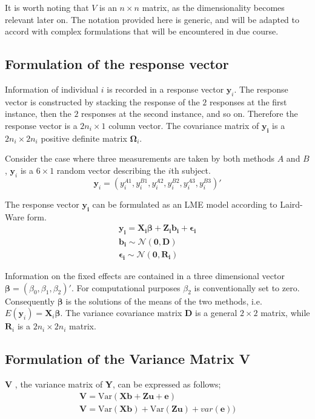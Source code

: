 \documentclass[12pt, a4paper]{report}
\theoremstyle{plain}
\theoremstyle{definition}
\theoremstyle{remark}
\begin{document}
It is worth noting that $V$ is an $n \times n$ matrix, as the dimensionality becomes relevant later on. The notation provided here is generic, and will be adapted to accord with complex formulations that will be encountered in due course.

\newpage

\subsection{Formulation of the response vector}
Information of individual $i$ is recorded in a response vector $\boldsymbol{y}_{i}$. The response vector is constructed by stacking the response of the $2$ responses at the first instance, then the $2$ responses at the second instance, and so on. Therefore the response vector is a $2n_{i} \times 1$ column vector.
The covariance matrix of $\boldsymbol{y_{i}}$ is a $2n_{i} \times 2n_{i}$ positive definite matrix $\boldsymbol{\Omega}_{i}$.

Consider the case where three measurements are taken by both methods $A$ and $B$, $\boldsymbol{y}_{i}$ is a $6 \times 1$ random vector describing the $i$th subject.
\[
\boldsymbol{y}_{i} = (y_{i}^{A1},y_{i}^{B1},y_{i}^{A2},y_{i}^{B2},y_{i}^{A3},y_{i}^{B3}) \prime
\]

The response vector $\boldsymbol{y_{i}}$ can be formulated as an LME model according to Laird-Ware form.
\begin{eqnarray*}
	\boldsymbol{y_{i}} = \boldsymbol{X_{i}\beta}  + \boldsymbol{Z_{i}b_{i}} + \boldsymbol{\epsilon_{i}}\\
	\boldsymbol{b_{i}} \sim \mathcal{N}(\boldsymbol{0,D})\\
	\boldsymbol{\epsilon_{i}} \sim \mathcal{N}(\boldsymbol{0,R_{i}})
\end{eqnarray*}

Information on the fixed effects are contained in a three dimensional vector $\boldsymbol{\beta} = (\beta_{0},\beta_{1},\beta_{2})\prime$. For computational purposes $\beta_{2}$ is conventionally set to zero. Consequently $\boldsymbol{\beta}$ is the solutions of the means of the two methods, i.e. $E(\boldsymbol{y}_{i})  = \boldsymbol{X}_{i}\boldsymbol{\beta}$. The variance covariance matrix $\boldsymbol{D}$ is a general $2 \times 2$ matrix, while $\boldsymbol{R}_{i}$ is a $2n_{i} \times 2n_{i}$ matrix.



\subsection{Formulation of the Variance Matrix V}
\textbf{V} , the variance matrix of \textbf{Y}, can be expressed
as follows;
\begin{eqnarray}
\textbf{V}= \textrm{Var} ( \textbf{Xb} + \textbf{Zu} + \textbf{e})\\
\textbf{V}= \textrm{Var} ( \textbf{Xb} ) + \textrm{Var} (\textbf{Zu}) +
var(\textbf{e}))
\end{eqnarray}
\end{document}
